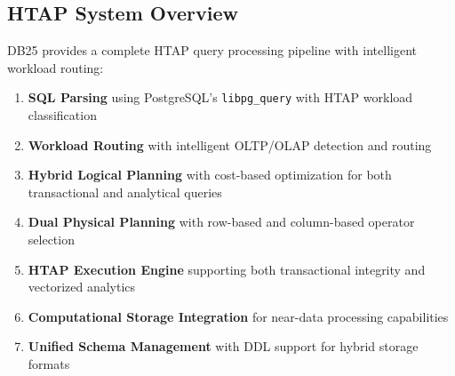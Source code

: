 \documentclass[12pt,a4paper]{article}
\begin{document}
    \subsection{HTAP System Overview}

    DB25 provides a complete HTAP query processing pipeline with intelligent workload routing:

    \begin{enumerate}
        \item \textbf{SQL Parsing} using PostgreSQL's \texttt{libpg\_query} with HTAP workload classification
        \item \textbf{Workload Routing} with intelligent OLTP/OLAP detection and routing
        \item \textbf{Hybrid Logical Planning} with cost-based optimization for both transactional and analytical queries
        \item \textbf{Dual Physical Planning} with row-based and column-based operator selection
        \item \textbf{HTAP Execution Engine} supporting both transactional integrity and vectorized analytics
        \item \textbf{Computational Storage Integration} for near-data processing capabilities
        \item \textbf{Unified Schema Management} with DDL support for hybrid storage formats
    \end{enumerate}
\end{document}
